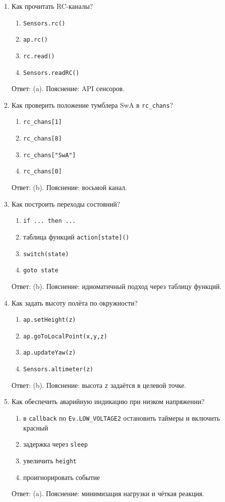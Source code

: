 \begin{enumerate}
  Ответ: (b). Пояснение: периодический таймер без блокировок.
  \item Как прочитать RC-каналы? 
  \begin{enumerate}[label=(\alph*)] \item \texttt{Sensors.rc()} \item \texttt{ap.rc()} \item \texttt{rc.read()} \item \texttt{Sensors.readRC()} \end{enumerate}
  Ответ: (a). Пояснение: API сенсоров.
  \item Как проверить положение тумблера SwA в \texttt{rc\_chans}? 
  \begin{enumerate}[label=(\alph*)] \item \texttt{rc\_chans[1]} \item \texttt{rc\_chans[8]} \item \texttt{rc\_chans["SwA"]} \item \texttt{rc\_chans[0]} \end{enumerate}
  Ответ: (b). Пояснение: восьмой канал.
  \item Как построить переходы состояний? 
  \begin{enumerate}[label=(\alph*)] \item \texttt{if ... then ...} \item таблица функций \texttt{action[state]()} \item \texttt{switch(state)} \item \texttt{goto state} \end{enumerate}
  Ответ: (b). Пояснение: идиоматичный подход через таблицу функций.
  \item Как задать высоту полёта по окружности? 
  \begin{enumerate}[label=(\alph*)] \item \texttt{ap.setHeight(z)} \item \texttt{ap.goToLocalPoint(x,y,z)} \item \texttt{ap.updateYaw(z)} \item \texttt{Sensors.altimeter(z)} \end{enumerate}
  Ответ: (b). Пояснение: высота \texttt{z} задаётся в целевой точке.
  \item Как обеспечить аварийную индикацию при низком напряжении? 
  \begin{enumerate}[label=(\alph*)] \item в \texttt{callback} по \texttt{Ev.LOW\_VOLTAGE2} остановить таймеры и включить красный \item задержка через \texttt{sleep} \item увеличить \texttt{height} \item проигнорировать событие \end{enumerate}
  Ответ: (a). Пояснение: минимизация нагрузки и чёткая реакция.
\end{enumerate}

